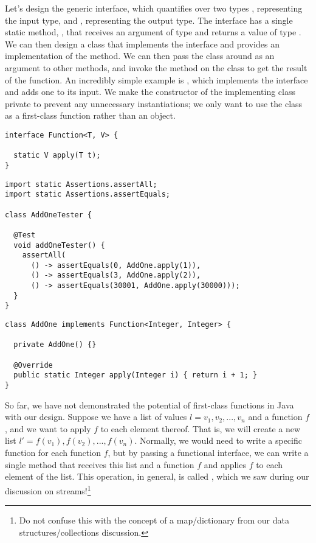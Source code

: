 Let's design the generic  interface, which quantifies over two types , representing the input type, and , representing the output type. The  interface has a single static method, , that receives an argument of type  and returns a value of type . We can then design a class that implements the  interface and provides an implementation of the  method. We can then pass the class around as an argument to other methods, and invoke the  method on the class to get the result of the function. An incredibly simple example is , which implements the  interface and adds one to its input. We make the constructor of the implementing class private to prevent any unnecessary instantiations; we only want to use the class as a first-class function rather than an object.

\begin{lstlisting}[language=MyJava]
interface Function<T, V> {

  static V apply(T t); 
}
\end{lstlisting}

\begin{lstlisting}[language=MyJava]
import static Assertions.assertAll;
import static Assertions.assertEquals;

class AddOneTester {

  @Test
  void addOneTester() {
    assertAll(
      () -> assertEquals(0, AddOne.apply(1)),
      () -> assertEquals(3, AddOne.apply(2)),
      () -> assertEquals(30001, AddOne.apply(30000)));
  }
}
\end{lstlisting}
\begin{lstlisting}[language=MyJava]
class AddOne implements Function<Integer, Integer> {

  private AddOne() {}

  @Override
  public static Integer apply(Integer i) { return i + 1; }
}
\end{lstlisting}

So far, we have not demonstrated the potential of first-class functions in Java with our design. Suppose we have a list of  values $l=v_1, v_2, ..., v_n$ and a function $f$, and we want to apply $f$ to each element thereof. That is, we will create a new list $l'=f(v_1), f(v_2), ..., f(v_n)$. Normally, we would need to write a specific function for each function $f$, but by passing a functional interface, we can write a single method that receives this list and a function $f$ and applies $f$ to each element of the list. This operation, in general, is called , which we saw during our discussion on streams!\footnote{Do not confuse this with the concept of a map/dictionary from our data structures/collections discussion.}

